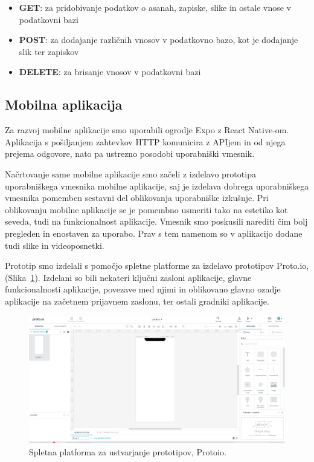 \documentclass[a4paper, 12pt]{book}
\begin{document}
 \begin{itemize}
  \item \textbf{GET}: za pridobivanje podatkov o asanah, zapiske, slike in ostale vnose v podatkovni bazi
  \item \textbf{POST}: za dodajanje različnih vnosov v podatkovno bazo, kot je dodajanje slik ter zapiskov
  \item \textbf{DELETE}: za brisanje vnosov v podatkovni bazi
\end{itemize}

\subsection{Mobilna aplikacija}
Za razvoj mobilne aplikacije smo uporabili ogrodje Expo z React Native-om. Aplikacija s pošiljanjem zahtevkov HTTP komunicira z APIjem in od njega prejema odgovore, nato pa ustrezno posodobi uporabniški vmesnik.

Načrtovanje same mobilne aplikacije smo začeli z izdelavo prototipa uporabniškega vmesnika mobilne aplikacije, saj je izdelava dobrega uporabniškega vmesnika pomemben sestavni del oblikovanja uporabniške izkušnje. Pri oblikovanju mobilne aplikacije se je pomembno usmeriti tako na estetiko kot seveda, tudi na funkcionalnost aplikacije. Vmesnik smo poskusili narediti čim bolj pregleden in enostaven za uporabo. Prav s tem namenom so v aplikacijo dodane tudi slike in videoposnetki.

Prototip smo izdelali s pomočjo spletne platforme za izdelavo prototipov Proto.io, (Slika~\ref{protoio}). Izdelani so bili nekateri ključni zasloni aplikacije, glavne funkcionalnosti aplikacije, povezave med njimi in oblikovano glavno ozadje aplikacije na začetnem prijavnem zaslonu, ter ostali gradniki aplikacije.\\

\begin{figure}[htbp]
\begin{center}
\includegraphics[scale=.23]{protoio.jpg}
\end{center}
\caption{Spletna platforma za ustvarjanje prototipov, Protoio.}
\label{protoio}
\end{figure}
\end{document}
